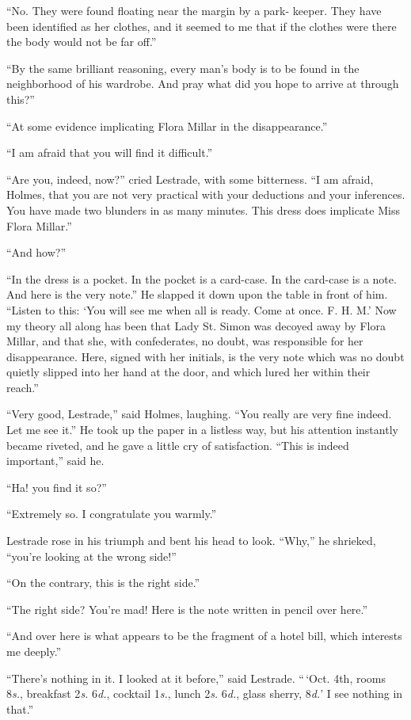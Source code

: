 “No. They were found floating near the margin by a park-%
keeper. They have been identified as her clothes, and it
seemed to me that if the clothes were there the body would
not be far off.”

“By the same brilliant reasoning, every man’s body is to be
found in the neighborhood of his wardrobe. And pray what
did you hope to arrive at through this?”

“At some evidence implicating Flora Millar in the
disappearance.”

“I am afraid that you will find it difficult.”

“Are you, indeed, now?” cried Lestrade, with some bitterness.
“I am afraid, Holmes, that you are not very practical
with your deductions and your inferences. You have made
two blunders in as many minutes. This dress does implicate
Miss Flora Millar.”

“And how?”

“In the dress is a pocket. In the pocket is a card-case.
In the card-case is a note. And here is the very note.” He
slapped it down upon the table in front of him. “Listen to
this: ‘You will see me when all is ready. Come at once.
F. H. M.’ Now my theory all along has been that Lady St.
Simon was decoyed away by Flora Millar, and that she, with
confederates, no doubt, was responsible for her disappearance.
Here, signed with her initials, is the very note which was no
doubt quietly slipped into her hand at the door, and which
lured her within their reach.”

“Very good, Lestrade,” said Holmes, laughing. “You
really are very fine indeed. Let me see it.” He took up the
paper in a listless way, but his attention instantly became
riveted, and he gave a little cry of satisfaction. “This is indeed
important,” said he.

“Ha! you find it so?”

“Extremely so. I congratulate you warmly.”

Lestrade rose in his triumph and bent his head to look.
“Why,” he shrieked, “you’re looking at the wrong side!”

“On the contrary, this is the right side.”

“The right side? You’re mad! Here is the note written
in pencil over here.”

“And over here is what appears to be the fragment of a
hotel bill, which interests me deeply.”

“There’s nothing in it. I looked at it before,” said Lestrade.
“\,‘Oct. 4th, rooms 8\textit{s.}, breakfast 2\textit{s.} 6\textit{d.}, cocktail 1\textit{s.},
lunch 2\textit{s.} 6\textit{d.}, glass sherry, 8\textit{d.}’ I see nothing in that.”

